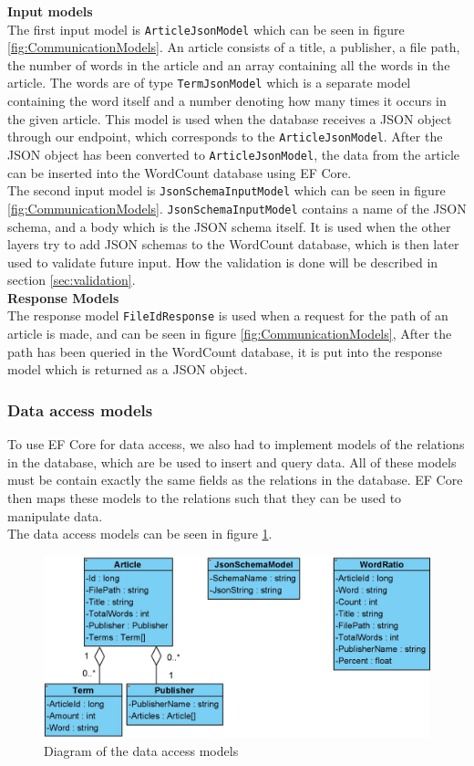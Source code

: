 \textbf{Input models}\\
The first input model is \texttt{ArticleJsonModel} which can be seen in figure \ref{fig:CommunicationModels}. An article consists of a title, a publisher, a file path, the number of words in the article and an array containing all the words in the article. 
The words are of type \texttt{TermJsonModel} which is a separate model containing the word itself and a number denoting how many times it occurs in the given article.
This model is used when the database receives a JSON object through our endpoint, which corresponds to the \texttt{ArticleJsonModel}. 
After the JSON object has been converted to \texttt{ArticleJsonModel}, the data from the article can be inserted into the WordCount database using EF Core.
\\
The second input model is \texttt{JsonSchemaInputModel} which can be seen in figure \ref*{fig:CommunicationModels}. \texttt{JsonSchemaInputModel} contains a name of the JSON schema, and a body which is the JSON schema itself. 
It is used when the other layers try to add JSON schemas to the WordCount database, which is then later used to validate future input. 
How the validation is done will be described in section \ref*{sec:validation}.
\\
\textbf{Response Models}\\
The response model \texttt{FileIdResponse} is used when a request for the path of an article is made, and can be seen in figure \ref*{fig:CommunicationModels},
After the path has been queried in the WordCount database, it is put into the response model which is returned as a JSON object.

\subsubsection*{Data access models}
To use EF Core for data access, we also had to implement models of the relations in the database, which are be used to insert and query data. 
All of these models must be contain exactly the same fields as the relations in the database.
EF Core then maps these models to the relations such that they can be used to manipulate data.
\\
The data access models can be seen in figure \ref*{fig:DataAccesModels}. 
\begin{figure}[H]
    \centering
    \includegraphics[scale=0.4]{Images/DataAccessModels.jpg}
    \caption{Diagram of the data access models}
    \label{fig:DataAccesModels}
\end{figure}